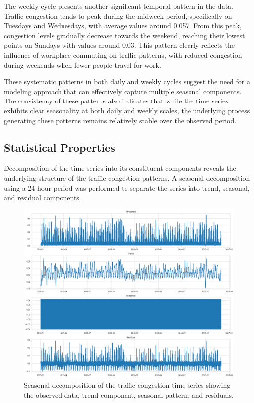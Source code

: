 \documentclass{article}
\begin{document}
The weekly cycle presents another significant temporal pattern in the data. Traffic congestion tends to peak during the midweek period, specifically on Tuesdays and Wednesdays, with average values around 0.057. From this peak, congestion levels gradually decrease towards the weekend, reaching their lowest points on Sundays with values around 0.03. This pattern clearly reflects the influence of workplace commuting on traffic patterns, with reduced congestion during weekends when fewer people travel for work.

These systematic patterns in both daily and weekly cycles suggest the need for a modeling approach that can effectively capture multiple seasonal components. The consistency of these patterns also indicates that while the time series exhibits clear seasonality at both daily and weekly scales, the underlying process generating these patterns remains relatively stable over the observed period.

\subsection{Statistical Properties}
Decomposition of the time series into its constituent components reveals the underlying structure of the traffic congestion patterns. A seasonal decomposition using a 24-hour period was performed to separate the series into trend, seasonal, and residual components.

\begin{figure}[htbp]
    \centering
    \includegraphics[width=\textwidth]{seasonal_decomp.png}
    \caption{Seasonal decomposition of the traffic congestion time series showing the observed data, trend component, seasonal pattern, and residuals.}
    \label{fig:decomposition}
\end{figure}
\end{document}
